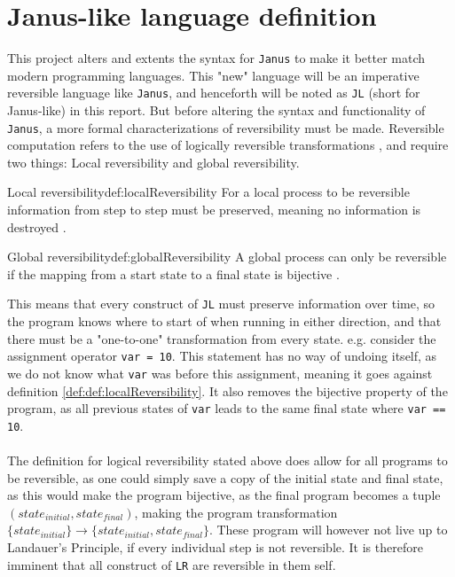 \section{Janus-like language definition}
This project alters and extents the syntax for \texttt{Janus} to make it better match modern
programming languages. This "new" language will be an imperative reversible language like
\texttt{Janus}, and henceforth will be noted as \texttt{JL} (short for Janus-like) in this report.
But before altering the syntax and functionality of \texttt{Janus}, a more formal characterizations
of reversibility must be made.
Reversible computation refers to the use of logically reversible transformations \cite{ARTICLE:2},
and require two things: Local reversibility and global reversibility.

\begin{myDefinition}{Local reversibility}{def:localReversibility}
For a local process to be reversible information from step to step must be preserved, meaning no
information is destroyed \cite{ARTICLE:1}.
\end{myDefinition}

\begin{myDefinition}{Global reversibility}{def:globalReversibility}
A global process can only be reversible if the mapping from a start state to a final state is
bijective \cite{ARTICLE:1}. 
\end{myDefinition}
\noindent
This means that every construct of \texttt{JL} must preserve information over time, so the program
knows where to start of when running in either direction, and that there must be a "one-to-one"
transformation from every state. e.g. consider the assignment operator \texttt{var = 10}. This
statement has no way of undoing itself, as we do not know what \texttt{var} was before this
assignment, meaning it goes against definition \ref{def:def:localReversibility}. It also removes
the bijective property of the program, as all previous states of \texttt{var} leads to the same
final state where \texttt{var == 10}.
\\
\\
The definition for logical reversibility stated above does allow for all programs to be reversible,
as one could simply save a copy of the initial state and final state, as this would make
the program bijective, as the final program becomes a tuple $(state_{initial}, state_{final})$,
making the program transformation $\{state_{initial}\} \to \{state_{initial}, state_{final}\}$.
These program will however not live up to Landauer's Principle, if every individual step is not
reversible. It is therefore imminent that all construct of \texttt{LR} are reversible in them self.

